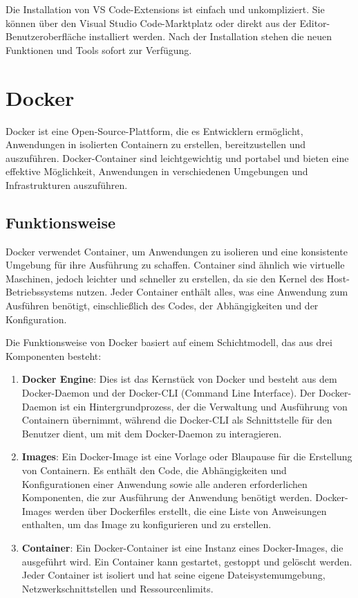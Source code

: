 Die Installation von VS Code-Extensions ist einfach und unkompliziert. Sie können über den Visual Studio Code-Marktplatz oder direkt aus der Editor-Benutzeroberfläche installiert werden.
Nach der Installation stehen die neuen Funktionen und Tools sofort zur Verfügung.
\pagebreak
\section{Docker}
Docker ist eine Open-Source-Plattform, die es Entwicklern ermöglicht, Anwendungen in isolierten Containern zu erstellen, bereitzustellen und auszuführen. 
Docker-Container sind leichtgewichtig und portabel und bieten eine effektive Möglichkeit, Anwendungen in verschiedenen Umgebungen und Infrastrukturen auszuführen.

\subsection{Funktionsweise}
Docker verwendet Container, um Anwendungen zu isolieren und eine konsistente Umgebung für ihre Ausführung zu schaffen. Container sind ähnlich wie virtuelle Maschinen, 
jedoch leichter und schneller zu erstellen, da sie den Kernel des Host-Betriebssystems nutzen. Jeder Container enthält alles, was eine Anwendung zum Ausführen benötigt, 
einschließlich des Codes, der Abhängigkeiten und der Konfiguration.

Die Funktionsweise von Docker basiert auf einem Schichtmodell, das aus drei Komponenten besteht:

\begin{enumerate}
    \item \textbf{Docker Engine}: Dies ist das Kernstück von Docker und besteht aus dem Docker-Daemon und der Docker-CLI (Command Line Interface). Der Docker-Daemon ist ein Hintergrundprozess, 
    der die Verwaltung und Ausführung von Containern übernimmt, während die Docker-CLI als Schnittstelle für den Benutzer dient, um mit dem Docker-Daemon zu interagieren.
    \item \textbf{Images}: Ein Docker-Image ist eine Vorlage oder Blaupause für die Erstellung von Containern. 
    Es enthält den Code, die Abhängigkeiten und Konfigurationen einer Anwendung sowie alle anderen erforderlichen Komponenten, die zur Ausführung der Anwendung benötigt werden. 
    Docker-Images werden über Dockerfiles erstellt, die eine Liste von Anweisungen enthalten, um das Image zu konfigurieren und zu erstellen.
    \item \textbf{Container}: Ein Docker-Container ist eine Instanz eines Docker-Images, die ausgeführt wird. Ein Container kann gestartet, gestoppt und gelöscht werden. 
    Jeder Container ist isoliert und hat seine eigene Dateisystemumgebung, Netzwerkschnittstellen und Ressourcenlimits.
    \end{enumerate}

